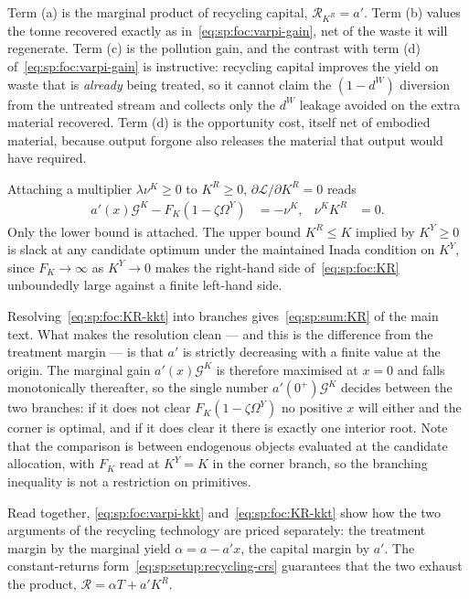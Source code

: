 Term (a) is the marginal product of recycling capital, $\mathcal R_{K^R}=a'$. Term (b) values the tonne recovered exactly as in~\eqref{eq:sp:foc:varpi-gain}, net of the waste it will regenerate. Term (c) is the pollution gain, and the contrast with term (d) of~\eqref{eq:sp:foc:varpi-gain} is instructive: recycling capital improves the yield on waste that is \emph{already} being treated, so it cannot claim the $\left(1-d^W\right)$ diversion from the untreated stream and collects only the $d^W$ leakage avoided on the extra material recovered. Term (d) is the opportunity cost, itself net of embodied material, because output forgone also releases the material that output would have required.

 Attaching a multiplier $\lambda\nu^K\ge0$ to $K^R\ge0$,
$\partial\mathcal L/\partial K^R=0$ reads
\begin{align}
a'\!\left(x\right)\mathcal G^K-F_K\left(1-\zeta\Omega^Y\right) &= -\nu^K,
&
\nu^KK^R &= 0 .
\label{eq:sp:foc:KR-kkt}
\end{align}
Only the lower bound is attached. The upper bound $K^R\le K$ implied by $K^Y\ge0$ is
slack at any candidate optimum under the maintained Inada condition on $K^Y$, since $F_K\to\infty$ as
$K^Y\to0$ makes the right-hand side of~\eqref{eq:sp:foc:KR} unboundedly large against a finite left-hand
side.

Resolving~\eqref{eq:sp:foc:KR-kkt} into branches gives~\eqref{eq:sp:sum:KR} of the main text. What
makes the resolution clean --- and this is the difference from the treatment margin --- is that
$a'$ is strictly decreasing with a finite value at the origin. The marginal gain
$a'\!\left(x\right)\mathcal G^K$ is therefore maximised at $x=0$ and falls monotonically thereafter,
so the single number $a'\!\left(0^+\right)\mathcal G^K$ decides between the two branches: if it does
not clear $F_K\left(1-\zeta\Omega^Y\right)$ no positive $x$ will either and the corner is optimal,
and if it does clear it there is exactly one interior root. Note that the comparison is between
endogenous objects evaluated at the candidate allocation, with $F_K$ read at $K^Y=K$ in the corner
branch, so the branching inequality is not a restriction on primitives.

Read together, \eqref{eq:sp:foc:varpi-kkt} and~\eqref{eq:sp:foc:KR-kkt} show how the two arguments of the recycling technology are priced separately: the treatment margin by the marginal yield $\alpha=a-a'x$, the capital margin by $a'$. The constant-returns form~\eqref{eq:sp:setup:recycling-crs} guarantees that the two exhaust the product, $\mathcal R=\alpha T+a'K^R$.

